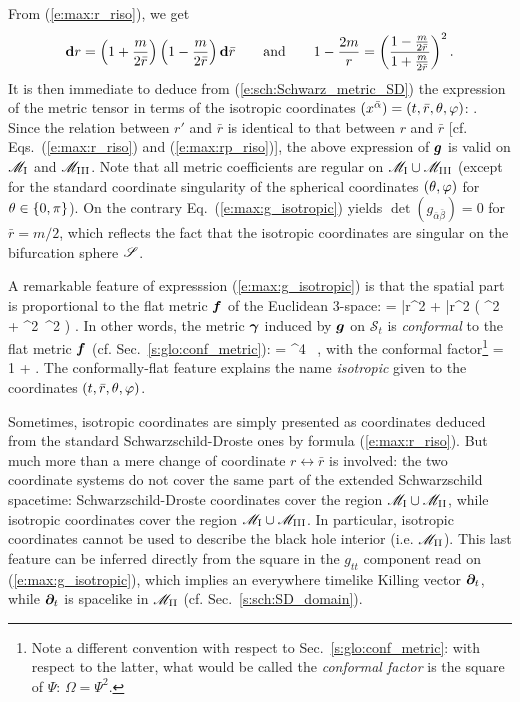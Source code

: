From (\ref{e:max:r_riso}), we get
\[
    \mathbf{d} r = \left( 1 + \frac{m}{2\bar{r}} \right) \left( 1 - \frac{m}{2\bar{r}} \right)
        \mathbf{d} \bar{r}
\qquad\mbox{and}\qquad
    1 - \frac{2m}{r} = \left(
        \frac{ 1 - \frac{m}{2\bar{r}}}{1 + \frac{m}{2\bar{r}}} \right) ^2 .
\]
It is then immediate to deduce from (\ref{e:sch:Schwarz_metric_SD})
the expression of the metric tensor in
terms of the isotropic coordinates $(x^{\bar{\alpha}}) = (t,\bar{r},\theta,\varphi)$:
\be \label{e:max:g_isotropic}
    .
\ee
Since the relation between $r'$ and $\bar{r}$ is identical to that between
$r$ and $\bar{r}$ [cf. Eqs.~(\ref{e:max:r_riso}) and (\ref{e:max:rp_riso})],
the above expression of $\bm{g}$ is valid on $\mathscr{M}_{\rm I}$ and $\mathscr{M}_{\rm III}$.
Note that all metric coefficients are regular on $\mathscr{M}_{\rm I}\cup\mathscr{M}_{\rm III}$
(except for the standard coordinate singularity of the spherical coordinates
$(\theta,\varphi)$ for $\theta\in\{0,\pi\}$). On the contrary Eq.~(\ref{e:max:g_isotropic})
yields $\det(g_{\bar{\alpha}\bar{\beta}}) = 0$ for $\bar{r}=m/2$, which reflects the fact that
the isotropic coordinates are singular on the bifurcation sphere $\mathscr{S}$.

A remarkable feature of expresssion (\ref{e:max:g_isotropic}) is
that the spatial part is proportional to
the flat metric $\bm{f}$ of the Euclidean 3-space:
\be
     = \dd \bar{r}^2 + \bar{r}^2 \left( \dd\th^2 + \sin^2\th\, \dd\ph^2 \right) .
\ee
In other words, the metric $\bm{\gamma}$ induced by $\bm{g}$ on $\mathcal{S}_t$
is \emph{conformal} to the flat metric $\bm{f}$
(cf. Sec.~\ref{s:glo:conf_metric}):
\be
    \w{\gamma} = \Psi^4 \,  ,
\ee
with the conformal factor\footnote{Note a different convention with respect
to Sec.~\ref{s:glo:conf_metric}: with respect to the latter, what would be
called the \emph{conformal factor} is the square of $\Psi$: $\Omega = \Psi^2$.}
\be
    \Psi = 1 +  .
\ee
The conformally-flat feature explains the name \emph{isotropic} given to the
coordinates $(t,\bar{r},\theta,\varphi)$.

\begin{remark}
Sometimes, isotropic coordinates are simply presented as
coordinates deduced from the standard Schwarzschild-Droste ones by
formula (\ref{e:max:r_riso}). But much more than a mere change
of coordinate $r \leftrightarrow \bar{r}$ is involved:
the two coordinate systems do not cover
the same part of the extended Schwarzschild spacetime: Schwarzschild-Droste
coordinates cover the region $\mathscr{M}_{\rm I}\cup \mathscr{M}_{\rm II}$, while
isotropic coordinates cover the region $\mathscr{M}_{\rm I}\cup \mathscr{M}_{\rm III}$.
In particular, isotropic coordinates cannot be used to describe the black
hole interior (i.e. $\mathscr{M}_{\rm II}$). This last feature can be inferred directly
from the square in the $g_{tt}$ component read on
(\ref{e:max:g_isotropic}), which implies
an everywhere timelike Killing vector $\bm{\partial}_t$, while
$\bm{\partial}_t$ is spacelike in $\mathscr{M}_{\rm II}$ (cf. Sec.~\ref{s:sch:SD_domain}).
\end{remark}

